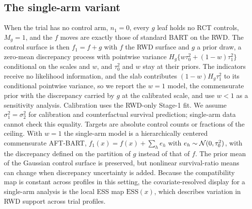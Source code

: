 \subsection{The single-arm variant}
\label{sec:singlearm}

When the trial has no control arm, $n_1=0$, every $g$ leaf holds no RCT controls, $M_g=1$, and the $f$ moves are exactly those of standard BART on the RWD. The control surface is then $f_1=f+g$ with $f$ the RWD surface and $g$ a prior draw, a zero-mean discrepancy process with pointwise variance $H_g\{w\tau_0^2+(1-w)\tau_1^2\}$ conditional on the scales and $w$, and $\tau_0^2$ and $w$ stay at their priors. The indicators receive no likelihood information, and the slab contributes $(1-w)H_g\tau_1^2$ to its conditional pointwise variance, so we report the $w=1$ model, the commensurate prior with the discrepancy carried by $g$ at the calibrated scale, and use $w<1$ as a sensitivity analysis. Calibration uses the RWD-only Stage-1 fit. We assume $\sigma_1^2=\sigma_2^2$ for calibration and counterfactual survival prediction; single-arm data cannot check this equality. Targets are absolute control counts or fractions of the ceiling. With $w=1$ the single-arm model is a hierarchically centered commensurate AFT-BART, $f_1(x)=f(x)+\sum_he_h$ with $e_h\sim\mathcal{N}(0,\tau_0^2)$, with the discrepancy defined on the partition of $g$ instead of that of $f$. The prior mean of the Gaussian control surface is preserved, but nonlinear survival-ratio means can change when discrepancy uncertainty is added. Because the compatibility map is constant across profiles in this setting, the covariate-resolved display for a single-arm analysis is the local ESS map $\mathrm{ESS}(x)$, which describes variation in RWD support across trial profiles.
